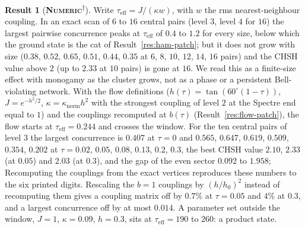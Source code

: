 \documentclass[11pt]{article}
\newcommand{\numeric}{\textbf{\textsc{Numeric}}}
\newcommand{\snap}{\textsuperscript{$\dagger$}}      %
\theoremstyle{definition}
\newtheorem{result}{Result}
\begin{document}
\begin{result}[\numeric\snap]\label{res:ent-flow}
Write $\tau_{\mathrm{eff}}=J/(\kappa w)$, with $w$ the rms nearest-neighbour coupling. In an exact scan of $6$ to $16$ central pairs (level $3$, level $4$ for $16$) the largest pairwise concurrence peaks at $\tau_{\mathrm{eff}}$ of $0.4$ to $1.2$ for every size, below which the ground state is the cat of Result~\ref{res:ham-patch}; but it does not grow with size ($0.38$, $0.52$, $0.65$, $0.51$, $0.44$, $0.35$ at $6$, $8$, $10$, $12$, $14$, $16$ pairs) and the CHSH value above $2$ (up to $2.33$ at $10$ pairs) is gone at $16$. We read this as a finite-size effect with monogamy as the cluster grows, not as a phase or a persistent Bell-violating network. With the flow definitions ($h(\tau)=\tan(60^\circ(1-\tau))$, $J=e^{-h^2/2}$, $\kappa=\kappa_{\mathrm{norm}}h^2$ with the strongest coupling of level $2$ at the Spectre end equal to $1$) and the couplings recomputed at $b(\tau)$ (Result~\ref{res:flow-patch}), the flow starts at $\tau_{\mathrm{eff}}=0.244$ and crosses the window. For the ten central pairs of level $3$ the largest concurrence is $0.407$ at $\tau=0$ and $0.565$, $0.647$, $0.619$, $0.509$, $0.354$, $0.202$ at $\tau=0.02$, $0.05$, $0.08$, $0.13$, $0.2$, $0.3$, the best CHSH value $2.10$, $2.33$ (at $0.05$) and $2.03$ (at $0.3$), and the gap of the even sector $0.092$ to $1.958$; Recomputing the couplings from the exact vertices reproduces these numbers to the six printed digits. Rescaling the $b=1$ couplings by $(h/h_0)^2$ instead of recomputing them gives a coupling matrix off by $0.7\%$ at $\tau=0.05$ and $4\%$ at $0.3$, and a largest concurrence off by at most $0.014$. A parameter set outside the window, $J=1$, $\kappa=0.09$, $h=0.3$, sits at $\tau_{\mathrm{eff}}=190$ to $260$: a product state.
\end{result}

\end{document}
